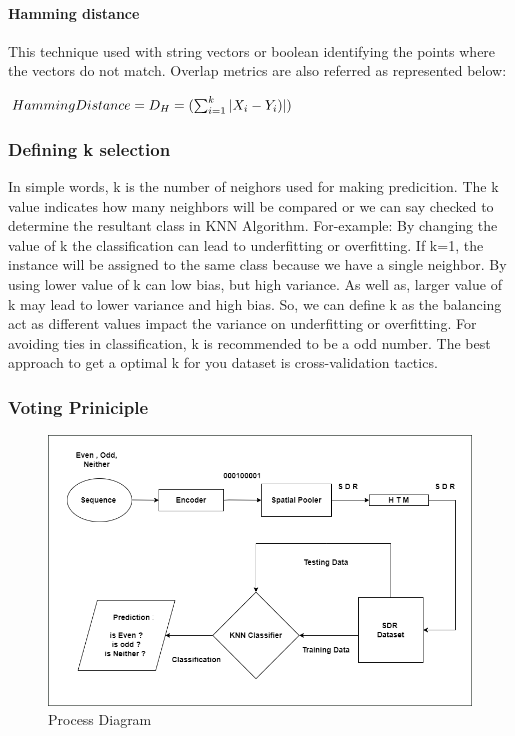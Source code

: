 \documentclass[conference]{IEEEtran}
\begin{document}
\paragraph{\textbf{Hamming distance}}
This technique used with string vectors or boolean identifying the points where the vectors do not match. Overlap metrics are also referred as represented below:

\begin{math}
 Hamming Distance = D_{H}=(\sum_{i=1}^{k} |X_{i} - Y_{i})|)
 \newline
\end{math}



\subsubsection{Defining k selection}
In simple words, k is the number of neighors used for making predicition. The k value indicates how many neighbors will be compared or we can say checked to determine the resultant class in KNN Algorithm. For-example: By changing the value of k the classification can lead to underfitting or overfitting. If k=1, the instance will be assigned to the same class because we have a single neighbor. By using lower value of k can low bias, but high variance. As well as, larger value of k may lead to lower variance and high bias. So, we can define k as the balancing act as different values impact the variance on underfitting or overfitting. For avoiding ties in classification, k is recommended to be a odd number. The best approach to get a optimal k for you dataset is cross-validation tactics.  


\subsubsection{Voting Priniciple}




\begin{figure}
    \centering
    \includegraphics[width=1.0\linewidth]{Process Diagram.png}
    \caption{Process Diagram}
    \label{fig:enter-label}
\end{figure}
\end{document}
